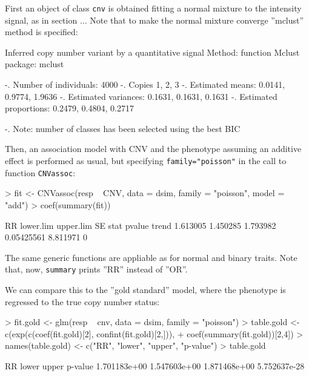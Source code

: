 \documentclass[11pt]{article}
\begin{document}
First an object of class \texttt{cnv} is obtained fitting a normal mixture to the intensity signal, as in section ...
Note that to make the normal mixture converge ''mclust'' method is specified:
\begin{Schunk}
\begin{Soutput}
Inferred copy number variant by a quantitative signal
   Method: function Mclust {package: mclust}  

-. Number of individuals: 4000 
-. Copies 1, 2, 3 
-. Estimated means: 0.0141, 0.9774, 1.9636 
-. Estimated variances: 0.1631, 0.1631, 0.1631 
-. Estimated proportions: 0.2479, 0.4804, 0.2717 


-. Note: number of classes has been selected using the best BIC
\end{Soutput}
\end{Schunk}

Then, an association model with CNV and the phenotype assuming an additive effect is performed as usual,
but specifying \texttt{family="poisson"} in the call to function \texttt{CNVassoc}:
\begin{Schunk}
\begin{Sinput}
> fit <- CNVassoc(resp ~ CNV, data = dsim, family = "poisson", model = "add")
> coef(summary(fit))
\end{Sinput}
\begin{Soutput}
            RR lower.lim upper.lim         SE     stat pvalue
trend 1.613005  1.450285  1.793982 0.05425561 8.811971      0
\end{Soutput}
\end{Schunk}

The same generic functions are appliable as for normal and binary traits. Note that, now, \texttt{summary} prints ''RR'' instead of
''OR''.

We can compare this to the ''gold standard'' model, where the phenotype is regressed to the true copy number status:
\begin{Schunk}
\begin{Sinput}
> fit.gold <- glm(resp ~ cnv, data = dsim, family = "poisson")
> table.gold <- c(exp(c(coef(fit.gold)[2], confint(fit.gold)[2,])), 
+ coef(summary(fit.gold))[2,4])
> names(table.gold) <- c("RR", "lower", "upper", "p-value")
> table.gold
\end{Sinput}
\begin{Soutput}
          RR        lower        upper      p-value 
1.701183e+00 1.547603e+00 1.871468e+00 5.752637e-28 
\end{Soutput}
\end{Schunk}
\end{document}
